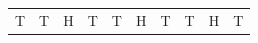 {\begin{center}
\begin{xtabular*}{\mytablewidth}[t]{|p{10\mystarwidth}|p{10\mystarwidth}|p{10\mystarwidth}|p{10\mystarwidth}|p{10\mystarwidth}|p{10\mystarwidth}|p{10\mystarwidth}|p{10\mystarwidth}|p{10\mystarwidth}|p{10\mystarwidth}|}
    
        T &
    
    
        T &
    
    
        H &
    
    
        T &
    
    
        T &
    
    
        H &
    
    
        T &
    
    
        T &
    
    
        H &
    
    
        T%
     \tabularnewline{}
    

\end{xtabular*}
\end{center}}
